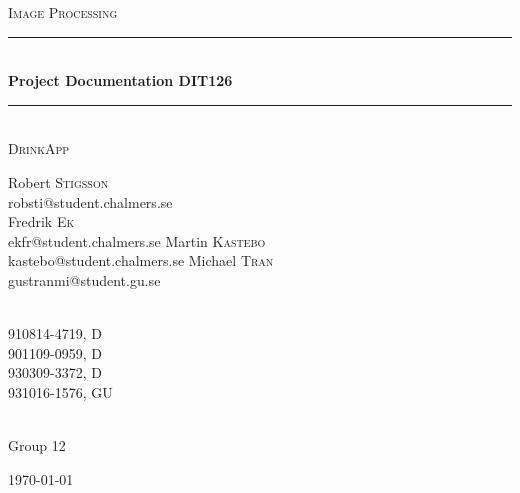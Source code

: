 \documentclass[a4paper]{article}
\title{}
\author{Robert Stigsson -- 910814-4719, \\Fredrik Ek -- 901109-0959, \\Martin Kastebo -- 930309-3372, \\Michael Tran -- 931016-1576}
\date{\today}
\newcommand{\HRule}{\rule{\linewidth}{0.5mm}}
\begin{document}
\begin{titlepage}

\begin{center}



\textsc{\LARGE Image Processing}\\[1.5cm]




\HRule \\[0.4cm]
{ \huge \bfseries Project Documentation DIT126}\\
\HRule \\[0.5cm]

\textsc{\Large DrinkApp}\\[0.4cm]


\begin{minipage}{0.4\textwidth}
\begin{flushleft} \large
Robert \textsc{Stigsson}\\
robsti@student.chalmers.se\\[0.4cm]
Fredrik \textsc{Ek}\\
ekfr@student.chalmers.se
Martin \textsc{Kastebo}\\
kastebo@student.chalmers.se
Michael \textsc{Tran}\\
gustranmi@student.gu.se

\end{flushleft}
\end{minipage}
\begin{minipage}{0.4\textwidth}
\begin{flushright} \large
\emph{} \\
910814-4719, \textsc{D}\\[0.8cm]
901109-0959, \textsc{D}\\[0.8cm]
930309-3372, \textsc{D}\\[0.8cm]
931016-1576, \textsc{GU}\\[0.8cm]


\end{flushright}
\end{minipage}\\[2.0cm]
Group 12
\vfill

{\large \today}

\end{center}

\end{titlepage}
\end{document}
